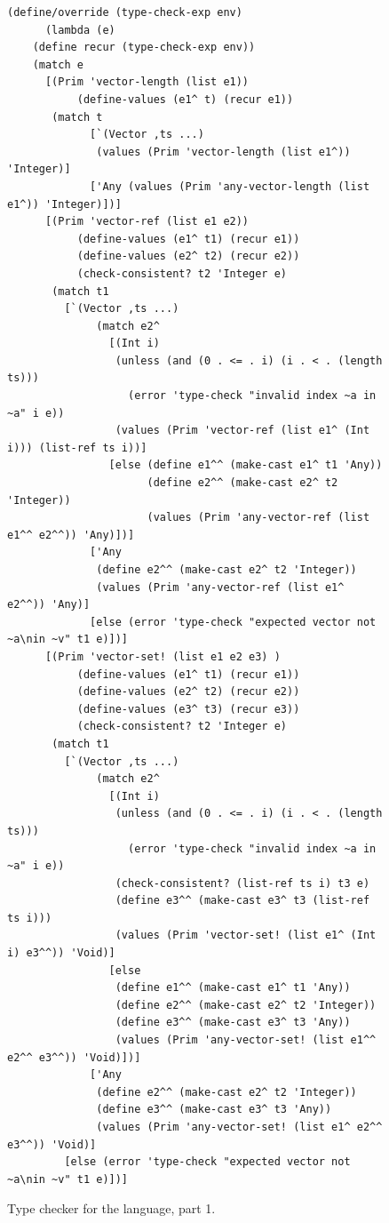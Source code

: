 \documentclass[7x10]{TimesAPriori_MIT}%
\numberwithin{theorem}{chapter}
\numberwithin{definition}{chapter}
\numberwithin{equation}{chapter}
\begin{document}
{\begin{figure}[tbp]
\begin{tcolorbox}[colback=white]
\begin{lstlisting}[basicstyle=\ttfamily\scriptsize]
    (define/override (type-check-exp env)
      (lambda (e)
	(define recur (type-check-exp env))
	(match e
	  [(Prim 'vector-length (list e1))
           (define-values (e1^ t) (recur e1))
	   (match t
             [`(Vector ,ts ...)
              (values (Prim 'vector-length (list e1^)) 'Integer)]
             ['Any (values (Prim 'any-vector-length (list e1^)) 'Integer)])]
	  [(Prim 'vector-ref (list e1 e2))
           (define-values (e1^ t1) (recur e1))
           (define-values (e2^ t2) (recur e2))
           (check-consistent? t2 'Integer e)
	   (match t1
	     [`(Vector ,ts ...)
              (match e2^
                [(Int i)
                 (unless (and (0 . <= . i) (i . < . (length ts)))
                   (error 'type-check "invalid index ~a in ~a" i e))
                 (values (Prim 'vector-ref (list e1^ (Int i))) (list-ref ts i))]
                [else (define e1^^ (make-cast e1^ t1 'Any))
                      (define e2^^ (make-cast e2^ t2 'Integer))
                      (values (Prim 'any-vector-ref (list e1^^ e2^^)) 'Any)])]
             ['Any
              (define e2^^ (make-cast e2^ t2 'Integer))
              (values (Prim 'any-vector-ref (list e1^ e2^^)) 'Any)]
             [else (error 'type-check "expected vector not ~a\nin ~v" t1 e)])]
	  [(Prim 'vector-set! (list e1 e2 e3) )
           (define-values (e1^ t1) (recur e1))
           (define-values (e2^ t2) (recur e2))
           (define-values (e3^ t3) (recur e3))
           (check-consistent? t2 'Integer e)
	   (match t1
	     [`(Vector ,ts ...)
              (match e2^
                [(Int i)
                 (unless (and (0 . <= . i) (i . < . (length ts)))
                   (error 'type-check "invalid index ~a in ~a" i e))
                 (check-consistent? (list-ref ts i) t3 e)
                 (define e3^^ (make-cast e3^ t3 (list-ref ts i)))
                 (values (Prim 'vector-set! (list e1^ (Int i) e3^^)) 'Void)]
                [else
                 (define e1^^ (make-cast e1^ t1 'Any))
                 (define e2^^ (make-cast e2^ t2 'Integer))
                 (define e3^^ (make-cast e3^ t3 'Any))
                 (values (Prim 'any-vector-set! (list e1^^ e2^^ e3^^)) 'Void)])]
             ['Any
              (define e2^^ (make-cast e2^ t2 'Integer))
              (define e3^^ (make-cast e3^ t3 'Any))
              (values (Prim 'any-vector-set! (list e1^ e2^^ e3^^)) 'Void)]
	     [else (error 'type-check "expected vector not ~a\nin ~v" t1 e)])]
\end{lstlisting}
\end{tcolorbox}
\caption{Type checker for the \LangGrad{} language, part 1.}
\label{fig:type-check-Lgradual-1}
\end{figure}

}
\end{document}

